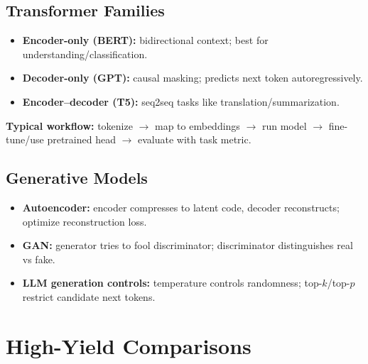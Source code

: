 \documentclass[10pt,twocolumn]{article}
\newcommand{\chead}[1]{\vspace{0.15em}\textbf{#1:} }
\begin{document}
\subsection{Transformer Families}
\begin{itemize}
  \item \textbf{Encoder-only (BERT):} bidirectional context; best for understanding/classification.
  \item \textbf{Decoder-only (GPT):} causal masking; predicts next token autoregressively.
  \item \textbf{Encoder--decoder (T5):} seq2seq tasks like translation/summarization.
\end{itemize}
\chead{Typical workflow} tokenize $\to$ map to embeddings $\to$ run model $\to$ fine-tune/use pretrained head $\to$ evaluate with task metric.

\subsection{Generative Models}
\begin{itemize}
  \item \textbf{Autoencoder:} encoder compresses to latent code, decoder reconstructs; optimize reconstruction loss.
  \item \textbf{GAN:} generator tries to fool discriminator; discriminator distinguishes real vs fake.
  \item \textbf{LLM generation controls:} temperature controls randomness; top-$k$/top-$p$ restrict candidate next tokens.
\end{itemize}

\section{High-Yield Comparisons}
\end{document}

